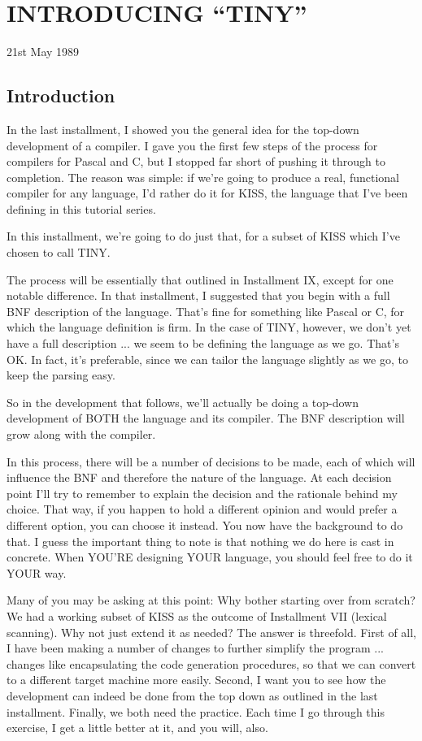 
\chapter{INTRODUCING ``TINY''}

21st May 1989

\section{Introduction}

In the last installment, I showed you the general  idea  for  the top-down development of  a  compiler. I gave you the first few steps  of  the process for compilers for  Pascal  and  C, but  I stopped  far  short  of  pushing  it through to completion. The reason was simple: if we're going to produce  a  real, functional compiler  for  any  language, I'd rather  do  it  for  KISS, the language that I've been defining in this tutorial series.

In this installment, we're going to do just that, for a subset of KISS which I've chosen to call TINY.

The process  will be essentially that outlined in Installment IX, except  for  one  notable  difference. In that  installment, I suggested  that  you  begin  with  a full BNF description of  the language. That's fine for something like Pascal or C, for which the language definition is  firm. In the case of TINY, however, we don't yet have a full  description  ... we seem to be defining the language as we go. That's OK. In  fact, it's preferable, since we can tailor the language  slightly  as we go, to keep the parsing easy.

So in the development  that  follows, we'll  actually be doing a top-down development of BOTH the  language and its compiler. The BNF description will grow along with the compiler.

In this process, there will be a number of decisions to  be made, each of which will influence the BNF and therefore the  nature of the language. At  each  decision  point I'll try to remember to explain  the  decision  and the rationale behind my choice. That way, if you happen to hold a different opinion and would prefer a different option, you can choose it instead. You  now  have  the background  to  do  that. I guess the important thing to note is that  nothing  we  do  here  is  cast  in  concrete. When YOU'RE designing YOUR language, you should feel free to do it YOUR way.

Many of you may be asking at this point: Why bother starting over from  scratch?  We had a working subset of KISS as the outcome of Installment  VII  (lexical  scanning). Why not just extend it as needed?  The  answer  is  threefold. First of all, I have been making  a  number  of changes to further simplify the program ... changes  like  encapsulating  the  code generation procedures, so that  we  can  convert to a different target machine more easily. Second, I want you to see how the development can indeed  be done from the top down as outlined in the last installment. Finally, we both need the practice. Each time I go through this exercise, I get a little better at it, and you will, also.

